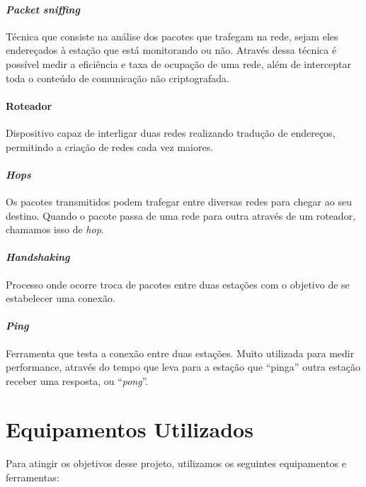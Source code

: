 \documentclass[12pt,a4paper]{report}
\begin{document}
\paragraph{\textit{Packet sniffing}} Técnica que consiste na análise dos pacotes que trafegam na rede, sejam eles endereçados à estação que está monitorando ou não. Através dessa técnica é possível medir a eficiência e taxa de ocupação de uma rede, além de interceptar toda o conteúdo de comunicação não criptografada.

\paragraph{Roteador} Dispositivo capaz de interligar duas redes realizando tradução de endereços, permitindo a criação de redes cada vez maiores.

\paragraph{\textit{Hops}} Os pacotes transmitidos podem trafegar entre diversas redes para chegar ao seu destino. Quando o pacote passa de uma rede para outra através de um roteador, chamamos isso de \textit{hop}.

\paragraph{\textit{Handshaking}} Processo onde ocorre troca de pacotes entre duas estações com o objetivo de se estabelecer uma conexão.

\paragraph{\textit{Ping}} Ferramenta que testa a conexão entre duas estações. Muito utilizada para medir performance, através do tempo que leva para a estação que ``pinga'' outra estação receber uma resposta, ou ``\textit{pong}''.

\section{Equipamentos Utilizados}

Para atingir os objetivos desse projeto, utilizamos os seguintes equipamentos e ferramentas:
\end{document}
